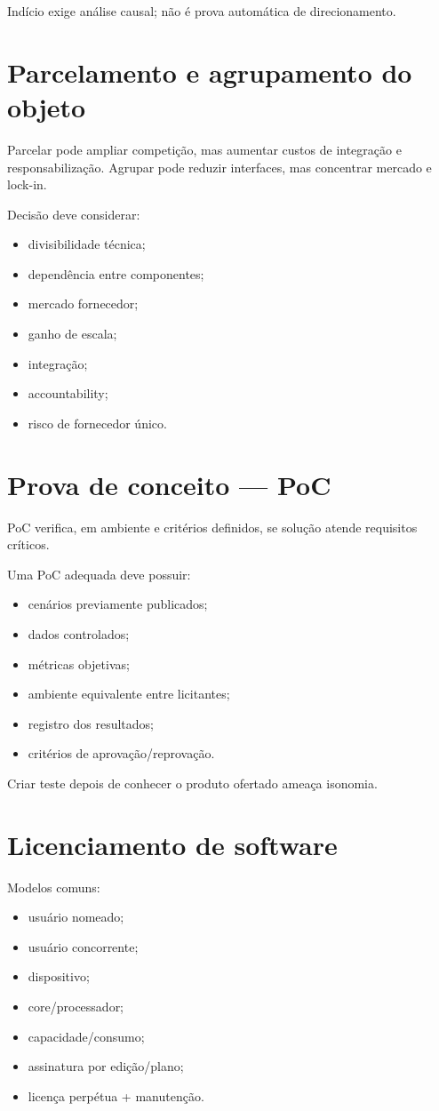 Indício exige análise causal; não é prova automática de direcionamento.

\section{Parcelamento e agrupamento do objeto}

Parcelar pode ampliar competição, mas aumentar custos de integração e responsabilização. Agrupar pode reduzir interfaces, mas concentrar mercado e lock-in.

Decisão deve considerar:
\begin{itemize}
\item divisibilidade técnica;
\item dependência entre componentes;
\item mercado fornecedor;
\item ganho de escala;
\item integração;
\item accountability;
\item risco de fornecedor único.
\end{itemize}

\section{Prova de conceito — PoC}

PoC verifica, em ambiente e critérios definidos, se solução atende requisitos críticos.

Uma PoC adequada deve possuir:
\begin{itemize}
\item cenários previamente publicados;
\item dados controlados;
\item métricas objetivas;
\item ambiente equivalente entre licitantes;
\item registro dos resultados;
\item critérios de aprovação/reprovação.
\end{itemize}

Criar teste depois de conhecer o produto ofertado ameaça isonomia.

\section{Licenciamento de software}

Modelos comuns:
\begin{itemize}
\item usuário nomeado;
\item usuário concorrente;
\item dispositivo;
\item core/processador;
\item capacidade/consumo;
\item assinatura por edição/plano;
\item licença perpétua + manutenção.
\end{itemize}

